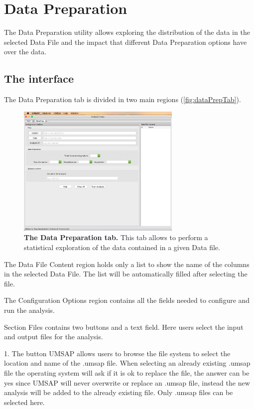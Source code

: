 \chapter{Data Preparation}
\label{chap:dataPrep}

The Data Preparation utility allows exploring the distribution of the data in the
selected Data File and the impact that different Data Preparation options have over
the data.

\section{The interface}

The Data Preparation tab is divided in two main regions (\autoref{fig:dataPrepTab}).

\begin{figure}[h]
    \centering
    \includegraphics[width=0.7\textwidth]{./IMAGES/DATAPREP/DataPrep.jpg}
    \caption[The Data Preparation tab]{\textbf{The Data Preparation tab.}
    This tab allows to perform a statistical exploration of the data contained in
    a given Data file.} 
    \label{fig:dataPrepTab}
    \vspace{-5pt}
\end{figure}

The Data File Content region holds only a list to show the name of the columns in
the selected Data File. The list will be automatically filled after selecting the
file.

The Configuration Options region contains all the fields needed to configure and
run the analysis. 

Section Files contains two buttons and a text field. Here users select the input
and output files for the analysis.

\num{1}. The button UMSAP allows users to browse the file system to select the location
and name of the .umsap file. When selecting an already existing .umsap file the operating
system will ask if it is ok to replace the file, the answer can be yes since UMSAP
will never overwrite or replace an .umsap file, instead the new analysis will be
added to the already existing file. Only .umsap files can be selected here.

